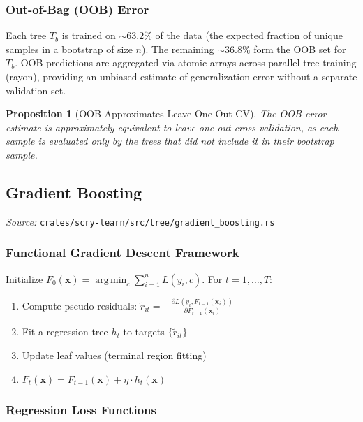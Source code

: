 \documentclass[11pt,a4paper]{article}
\newtheorem{proposition}[theorem]{Proposition}
\theoremstyle{definition}
\theoremstyle{remark}
\DeclareMathOperator*{\argmin}{arg\,min}
\begin{document}
\subsubsection*{Out-of-Bag (OOB) Error}

Each tree $T_b$ is trained on $\sim 63.2\%$ of the data (the expected fraction of unique samples in a bootstrap of size $n$). The remaining $\sim 36.8\%$ form the OOB set for $T_b$. OOB predictions are aggregated via atomic arrays across parallel tree training (rayon), providing an unbiased estimate of generalization error without a separate validation set.

\begin{proposition}[OOB Approximates Leave-One-Out CV]
The OOB error estimate is approximately equivalent to leave-one-out cross-validation, as each sample is evaluated only by the trees that did not include it in their bootstrap sample.
\end{proposition}

\subsection{Gradient Boosting}
\label{sec:gbt}

\noindent\textit{Source:} \texttt{crates/scry-learn/src/tree/gradient\_boosting.rs}

\subsubsection*{Functional Gradient Descent Framework}

Initialize $F_0(\mathbf{x}) = \argmin_c \sum_{i=1}^n L(y_i, c)$. For $t = 1, \ldots, T$:

\begin{enumerate}[label=\arabic*., itemsep=0pt]
\item Compute pseudo-residuals: $\tilde{r}_{it} = -\frac{\partial L(y_i, F_{t-1}(\mathbf{x}_i))}{\partial F_{t-1}(\mathbf{x}_i)}$
\item Fit a regression tree $h_t$ to targets $\{\tilde{r}_{it}\}$
\item Update leaf values (terminal region fitting)
\item $F_t(\mathbf{x}) = F_{t-1}(\mathbf{x}) + \eta \cdot h_t(\mathbf{x})$
\end{enumerate}

\subsubsection*{Regression Loss Functions}
\end{document}
